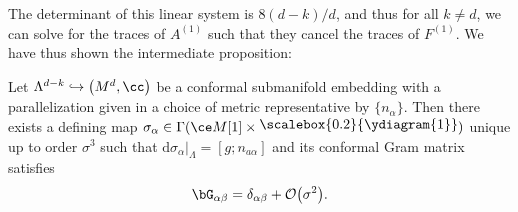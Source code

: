 The determinant of this linear system  is $8(d-k)/d$, and thus for all $k \neq d$, we can solve for the traces of $A^{(1)}$ such that they cancel the traces of $F^{(1)}$. We have thus shown the intermediate proposition:
\begin{Proposition}
Let $\Lambda^{d-k} \hookrightarrow \bigl(M^d,\cc\bigr)$ be a conformal submanifold embedding with a parallelization given in a choice of metric representative by $\{n_{\alpha}\}$. Then there exists a defining map $\sigma_{\alpha} \in \Gamma(\ce M[1] \times \raisebox{2pt}{\scalebox{0.2}{\ydiagram{1}}})$ unique up to order $\sigma^3$ such that $\mathrm{d} \sigma_{\alpha}|_{\Lambda} = [g; n_{a \alpha}]$ and its conformal Gram matrix satisfies
\[\bG_{\alpha \beta} = \delta_{\alpha \beta} + \mathcal{O}\bigl(\sigma^2\bigr) .\]
\end{Proposition}

